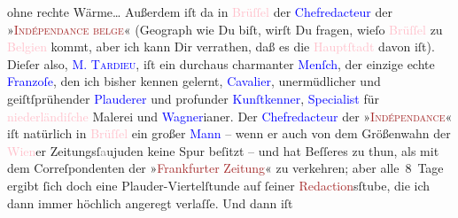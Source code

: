                ohne rechte Wärme{\dots} Außerdem iſt da in \textcolor{pink}{Brüſſel}{}\ledrightnote{\textcolor{pink}{Brüssel}} der \textcolor{blue}{Chefredacteur}{} der »\textsc{\textcolor{brown}{Indépendance belge}{}\ledrightnote{\textcolor{brown}{L’Indépendance Belge}}}« (Geograph wie Du biſt, wirſt Du fragen, {\pb}wieſo \textcolor{pink}{Brüſſel}{}\ledrightnote{\textcolor{pink}{Brüssel}} zu \textcolor{pink}{Belgien}{}\ledrightnote{\textcolor{pink}{Belgien}} kommt, aber ich kann Dir verrathen, daß es die \textcolor{pink}{Hauptſtadt}{} davon iſt). Dieſer also, \textsc{\textcolor{blue}{M. Tardieu}{}\ledrightnote{\textcolor{blue}{Charles Tardieu}}}, iſt ein durchaus charmanter \textcolor{blue}{Menſch}{}, der einzige echte \textcolor{blue}{Franzoſe}{}, den ich bisher kennen gelernt, \textcolor{blue}{Cavalier}{}, unermüdlicher und geiſtſprühender
                  \textcolor{blue}{Plauderer}{} und profunder
                  \textcolor{blue}{Kunſtkenner}{}, \textcolor{blue}{Specialist}{} für \textcolor{pink}{niederländiſche}{}\ledrightnote{\textcolor{pink}{Niederlande}} Malerei und \label{K_L02664-10v}\label{K_L02664-10h}\textcolor{blue}{Wagner}{}\ledrightnote{\textcolor{blue}{Richard Wagner}}ianer. Der \textcolor{blue}{Chefredacteur}{} der »\textsc{\textcolor{brown}{Indépendance}{}\ledrightnote{\textcolor{brown}{L’Indépendance Belge}}}« iſt natürlich in \textcolor{pink}{Brüſſel}{}\ledrightnote{\textcolor{pink}{Brüssel}} ein großer \textcolor{blue}{Mann}{} – wenn \introOben{}er\introOben{} auch von dem Größenwahn der \textcolor{pink}{Wien}{}\ledrightnote{\textcolor{pink}{Wien}}er Zeitungsſ\textcolor{gray}{a}ujuden keine Spur beſitzt – und hat
               Beſſeres zu thun, als mit dem Correſpondenten der »\textcolor{brown}{Frankfurter Zeitung}{}\ledrightnote{\textcolor{brown}{Frankfurter Zeitung}}« zu verkehren; aber alle 8 Tage ergibt ſich doch eine
               Plauder-Viertelſtunde auf ſeiner \textcolor{brown}{Redaction}{}sſtube, die ich dann immer höchlich angeregt verlaſſe. Und dann iſt
